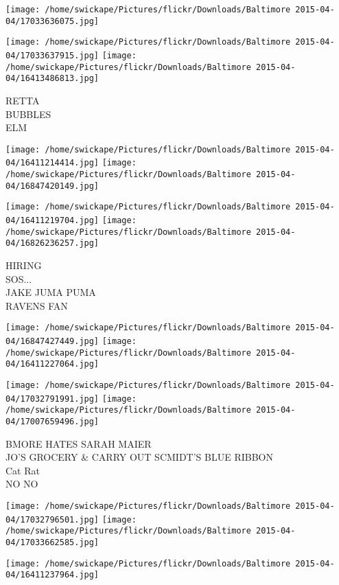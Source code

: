 \documentclass[10pt,letterpaper]{article}
\begin{document}
\texttt{[image: /home/swickape/Pictures/flickr/Downloads/Baltimore 2015-04-04/17033636075.jpg]}

\vspace{0.25in}
\texttt{[image: /home/swickape/Pictures/flickr/Downloads/Baltimore 2015-04-04/17033637915.jpg]}
\texttt{[image: /home/swickape/Pictures/flickr/Downloads/Baltimore 2015-04-04/16413486813.jpg]}

RETTA\\
BUBBLES\\
ELM\\
\pagebreak

\texttt{[image: /home/swickape/Pictures/flickr/Downloads/Baltimore 2015-04-04/16411214414.jpg]}
\texttt{[image: /home/swickape/Pictures/flickr/Downloads/Baltimore 2015-04-04/16847420149.jpg]}

\texttt{[image: /home/swickape/Pictures/flickr/Downloads/Baltimore 2015-04-04/16411219704.jpg]}
\texttt{[image: /home/swickape/Pictures/flickr/Downloads/Baltimore 2015-04-04/16826236257.jpg]}

HIRING\\
SOS...\\
JAKE JUMA PUMA\\
RAVENS FAN\\
\pagebreak

\texttt{[image: /home/swickape/Pictures/flickr/Downloads/Baltimore 2015-04-04/16847427449.jpg]}
\texttt{[image: /home/swickape/Pictures/flickr/Downloads/Baltimore 2015-04-04/16411227064.jpg]}

\texttt{[image: /home/swickape/Pictures/flickr/Downloads/Baltimore 2015-04-04/17032791991.jpg]}
\texttt{[image: /home/swickape/Pictures/flickr/Downloads/Baltimore 2015-04-04/17007659496.jpg]}

BMORE HATES SARAH MAIER\\
JO'S GROCERY \& CARRY OUT SCMIDT'S BLUE RIBBON\\
Cat Rat\\
NO NO\\
\pagebreak

\texttt{[image: /home/swickape/Pictures/flickr/Downloads/Baltimore 2015-04-04/17032796501.jpg]}
\texttt{[image: /home/swickape/Pictures/flickr/Downloads/Baltimore 2015-04-04/17033662585.jpg]}

\vspace{0.25in}
\texttt{[image: /home/swickape/Pictures/flickr/Downloads/Baltimore 2015-04-04/16411237964.jpg]}
\end{document}
